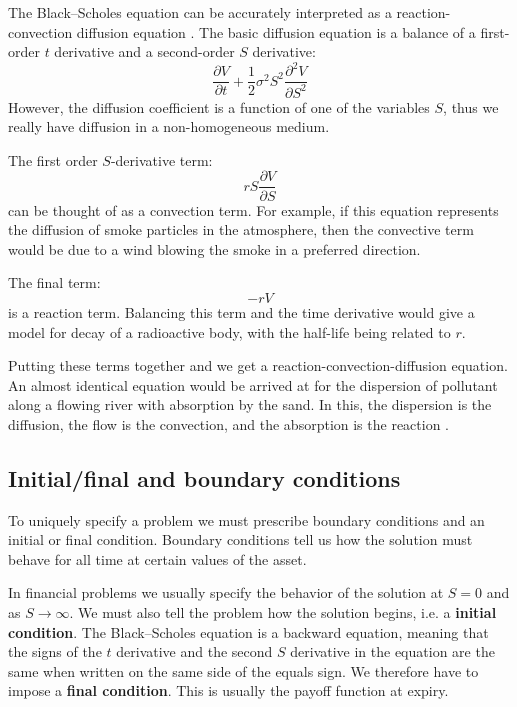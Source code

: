 The Black–Scholes equation can be accurately interpreted as a reaction-convection diffusion equation \cite{pw_iqf2ed_2007}. The basic diffusion equation is a balance of a first-order $t$ derivative and a second-order $S$ derivative:
\begin{equation}
    \frac{\partial V}{\partial t} + \frac{1}{2} \sigma^2 S^2 \frac{\partial^2 V}{\partial S^2} 
    \nonumber
\end{equation}
However, the diffusion coefficient is a function of one of the variables $S$, thus we really have diffusion in a non-homogeneous medium.

The first order $S$-derivative term:
\begin{equation}
    rS \frac{\partial V}{\partial S}
    \nonumber
\end{equation}
can be thought of as a convection term. For example, if this equation represents the diffusion of smoke particles in the atmosphere, then the convective term would be due to a wind blowing the smoke in a preferred direction.

The final term:
\begin{equation}
    -rV
    \nonumber
\end{equation}
is a reaction term. Balancing this term and the time derivative would give a model for decay of a radioactive body, with the half-life being related to $r$.

Putting these terms together and we get a reaction-convection-diffusion equation. An almost identical equation would be arrived at for the dispersion of pollutant along a flowing river with absorption by the sand. In this, the dispersion is the diffusion, the flow is the convection, and the absorption is the reaction \cite{pw_iqf2ed_2007}.



\subsection{Initial/final and boundary conditions}
To uniquely specify a problem we must prescribe boundary conditions and an initial or final condition. Boundary conditions tell us how the solution must behave for all time at certain values of the asset. 

In financial problems we usually specify the behavior of the solution at $S = 0$ and as $S \rightarrow \infty$. We must also tell the problem how the solution begins, i.e. a \textbf{initial condition}. The Black–Scholes equation is a backward equation, meaning that the signs of the $t$ derivative and the second $S$ derivative in the equation are the same when written on the same side of the equals sign. We therefore have to impose a \textbf{final condition}. This is usually the payoff function at expiry.

